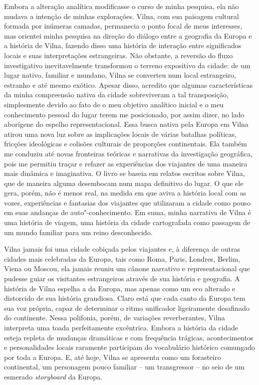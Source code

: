 Embora a alteração analítica modificasse o curso de minha pesquisa, ela
não mudava a intenção de minhas explorações. Vilna, com sua paisagem
cultural formada por inúmeras camadas, permanecia o ponto focal de meus
interesses, mas orientei minha pesquisa na direção do diálogo entre a
geografia da Europa e a história de Vilna, fazendo disso uma história de
interação entre significados locais e suas interpretações estrangeiras.
Não obstante, a reversão do fluxo investigativo inevitavelmente
transformou o terreno expositivo da cidade: de um lugar nativo, familiar
e mundano, Vilna se converteu num local estrangeiro, estranho e até
mesmo exótico. Apesar disso, acredito que algumas características da
minha compreensão nativa da cidade sobreviveram a tal transposição,
simplesmente devido ao fato de o meu objetivo analítico inicial e o meu
conhecimento pessoal do lugar terem me posicionado, por assim dizer, no
lado aborígene do espelho representacional. Essa busca nativa pela
Europa em Vilna atirou uma nova luz sobre as implicações locais de
várias batalhas políticas, fricções ideológicas e colisões culturais de
proporções continentais. Ela também me conduziu até novas fronteiras
teóricas e narrativas da investigação geográfica, pois me permitiu
traçar e refazer as experiências dos viajantes de uma maneira mais
dinâmica e imaginativa. O livro se baseia em relatos escritos sobre
Vilna, que de maneira alguma desembocam num mapa definitivo do lugar. O
que ele gera, porém, não é menos real, na medida em que aviva a história
local com as vozes, experiências e fantasias dos viajantes que
utilizaram a cidade como pouso em suas andanças de auto"-conhecimento. Em
suma, minha narrativa de Vilna é uma história de viagem, uma história da
cidade cartografada como passagem de um mundo familiar para um reino
desconhecido.

Vilna jamais foi uma cidade cobiçada pelos viajantes e, à diferença de
outras cidades mais celebradas da Europa, tais como Roma, Paris,
Londres, Berlim, Viena ou Moscou, ela jamais reuniu um cânone narrativo
e representacional que pudesse guiar os visitantes estrangeiros através
de sua história e geografia. A história de Vilna espelha a da Europa,
mas apenas como um eco alterado e distorcido de sua história grandiosa.
Claro está que cada canto da Europa tem sua voz própria, capaz de
determinar o ritmo unificador ligeiramente desafinado do continente.
Nessa polifonia, porém, de variações reverberantes, Vilna interpreta uma
toada perfeitamente excêntrica. Embora a história da cidade esteja
repleta de mudanças dramáticas e com frequência trágicas, acontecimentos
e personalidades locais raramente participam do vocabulário histórico
comungado por toda a Europa. E, até hoje, Vilna se apresenta como um
forasteiro continental, um personagem pouco familiar -- um transgressor --
no seio de um esmerado \textit{storyboard} da Europa.

